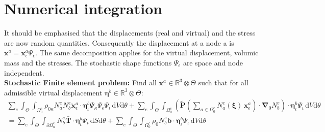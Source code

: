 \documentclass[oneside,11pt,times]{book}
\begin{document}
\section{Numerical integration}\label{sectionNumerical integration}

It should be emphasised that the displacements (real and virtual) and the stress are now random quantities. Consequently the displacement at a node a is $\bm{x}^a = \bm{x}^a_{\epsilon}\Psi_{\epsilon}$. The same decomposition applies for the virtual displacement, volumic mass and the stresses. The stochastic shape functions $\Psi_{\epsilon}$ are space and node independent.
\\
\textbf{Stochastic Finite element problem:} Find all $\bm{x}^a \in \mathbb{R}^3 \otimes \Theta$ such that for all admissible virtual displacement $\bm{\eta}^b \in \mathbb{R}^3 \otimes \Theta$:
%
\begin{equation} \label{equationGlobalWeakForm0}
 \begin{split}
 \sum_e \int_{\Theta}\int_{\Omega_{0}^e} \rho_{0\kappa} N^e_a N^e_b \ddot{\bm{x}}^a_{\epsilon} \cdot \bm{\eta}^b_{\iota} \Psi_{\kappa}\Psi_{\epsilon}\Psi_{\iota}\, \text{d} V  \text{d}\theta  + \sum_e \int_{\Theta}\int_{\Omega_{0}^e} \left(\tilde{\bm{P}}\left( \sum_{a \in \Omega_{0}^e} N^e_{a}(\bm{\xi})\, \bm{x}^a_{\epsilon} \right) \cdot  \bm{\nabla}\!_0 N^e_b  \right)  \cdot \bm{\eta}^b_{\iota}\Psi_{\iota}\, \text{d} V \text{d}\theta \\ = \sum_e \int_{\Theta} \int_{\partial \Omega_{n}^e} N_b^e \bar{\bm{T}} \cdot \bm{\eta}^b_{\iota} \Psi_{\iota} \, \text{d} S \text{d}\theta + \sum_e \int_{\Theta}\int_{\Omega_{0}^e} \rho_0 N_b^e \bm{b} \cdot \bm{\eta}^b_{\iota} \Psi_{\iota} \, \text{d} V \text{d}\theta
 \end{split}
\end{equation}
%
\end{document}
